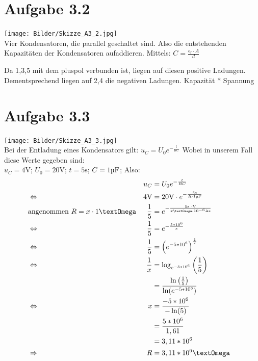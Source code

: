 \documentclass[]{article}
\newcommand{\eq}{\Leftrightarrow}
\newcommand{\rarr}{\Rightarrow}
\newcommand{\unit}[1]{\text{#1}}
\newcommand{\tdot}{\ensuremath{\cdot}}
\begin{document}
\section*{Aufgabe 3.2}
\par
	\texttt{[image: Bilder/Skizze\_A3\_2.jpg]}\\
	Vier Kondensatoren, die parallel geschaltet sind. Also die entstehenden Kapazitäten der Kondensatoren aufaddieren. Mittels: $C = \frac{ \epsilon_r \cdot A}{d}$

	Da 1,3,5 mit dem pluspol verbunden ist, liegen auf diesen positive Ladungen. Dementsprechend liegen auf 2,4 die negativen Ladungen.
	Kapazität * Spannung
\section*{Aufgabe 3.3}
\par
	\texttt{[image: Bilder/Skizze\_A3\_3.jpg]}\\
	Bei der Entladung eines Kondensators gilt: $u_C = U_0e^{-\frac{t}{RC}}$ Wobei in unserem Fall diese Werte gegeben sind:\\
	$u_C = 4\unit{V}$; $U_0 = 20\unit{V}$; $t = 5\unit{s}$; $C = 1\unit{\textmu F}$; Also:
	\begin{align*}
		&& u_C &= U_0e^{-\frac{t}{RC}} &&\\
		&\eq& 4\unit{V} &= 20\unit{V} \cdot e^{-\frac{5\unit{s}}{R \cdot 1\unit{\textmu F}}} &&\\
		&\text{angenommen $R = x \cdot 1 \unit{\textOmega}$}& \frac{1}{5} &= e^{-\frac{5\unit{s \tdot V}}{x\unit{\textOmega} \cdot 10^{-6}\unit{As}}} &&\\
		&\eq& \frac{1}{5} &= e^{-\frac{5 * 10^{6}}{x}} &&\\
		&\eq& \frac{1}{5} &= \left(e^{-5 * 10^{6}}\right)^{\frac{1}{x}} &&\\
		&\eq& \frac{1}{x} &= \log_{e^{-5*10^6}}\left(\frac{1}{5}\right) &&\\
		&&  &= \frac{\ln\left(\frac{1}{5}\right)}{\ln(e^{-5*10^6})} &&\\
		&\eq&  x&= \frac{-5*10^6}{-\ln(5)} &&\\
		&&  &= \frac{5*10^6}{1,61} &&\\
		&&  &= 3,11*10^6 &&\\
		&\rarr&  R&= 3,11*10^6\unit{\textOmega} &&\\
	\end{align*}
\end{document}

